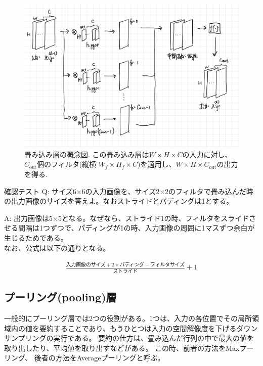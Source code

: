 \documentclass{ltjsarticle}
\begin{document}
\begin{figure}
  \centering
  \includegraphics[width=12cm]{./capture/Convolution_layer.png}
  \caption{畳み込み層の概念図. この畳み込み層は$W\times H \times C$の入力に対し、$C_{\text{out}}$個のフィルタ(縦横 $W_f\times H_f \times C$)を適用し、$W\times H \times C_{\text{out}}$の出力を得る.}
  \label{fig:convolution_layer}
\end{figure}

\begin{itembox}[l]{確認テスト}
  Q: サイズ6×6の入力画像を、サイズ2×2のフィルタで畳み込んだ時の出力画像のサイズを答えよ。なおストライドとパディングは1とする。
 
  A: 出力画像は5×5となる。なぜなら、ストライド1の時、フィルタをスライドさせる間隔は1つずつで、パディングが1の時、入力画像の周囲に1マスずつ余白が生じるためである。\\
  なお、公式は以下の通りとなる。

  \begin{align}
    \frac{{\text{入力画像のサイズ}} + 2 \times \text{パディング} - \text{フィルタサイズ}}{{\text{ストライド}}} + 1
  \end{align}
 
\end{itembox}

\subsection{プーリング(pooling)層}
一般的にプーリング層では2つの役割がある。1つは、入力の各位置でその局所領域内の値を要約することであり、もうひとつは入力の空間解像度を下げるダウンサンプリングの実行である。
要約の仕方は、畳み込んだ行列の中で最大の値を取り出したり、平均値を取り出すなどがある。
この時、前者の方法をMaxプーリング、 後者の方法をAverageプーリングと呼ぶ。
\end{document}
